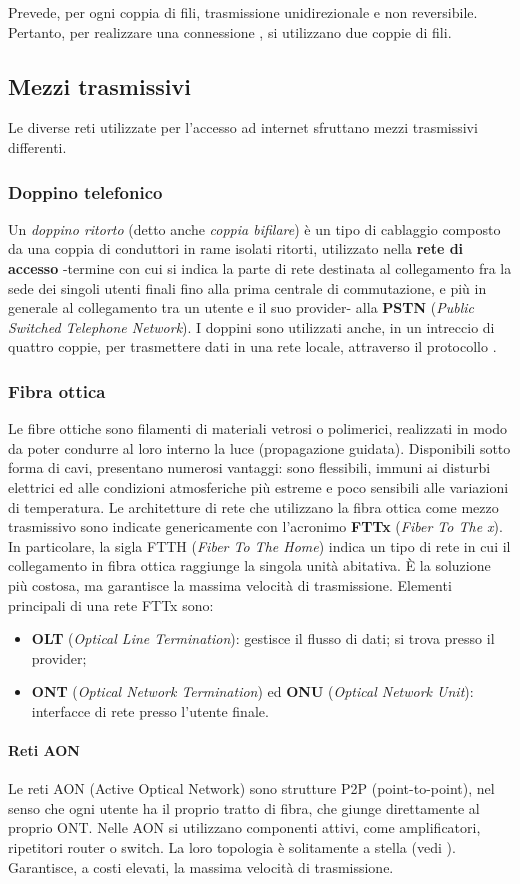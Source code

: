 \documentclass[a4paper,11pt]{article}
\def\sub#1{\subsection{#1}\label{#1}}
\def\subsub#1{\subsubsection{#1}\label{#1}}
\def\vedi#1{\nameref{#1}}
\begin{document}
Prevede, per ogni coppia di fili, trasmissione unidirezionale e non reversibile. Pertanto, per realizzare una connessione \vedi{Full-Duplex}, si utilizzano due coppie di fili. 
\sub{Mezzi trasmissivi}
Le diverse reti utilizzate per l'accesso ad internet sfruttano mezzi trasmissivi differenti.
\subsub{Doppino telefonico}
Un \textit{doppino ritorto} (detto anche \textit{coppia bifilare}) è un tipo di cablaggio composto da una coppia di conduttori in rame isolati ritorti, utilizzato nella \textbf{rete di accesso} -termine con cui si indica la parte di rete destinata al collegamento fra la sede dei singoli utenti finali fino alla prima centrale di commutazione, e più in generale al collegamento tra un utente e il suo provider- alla \textbf{PSTN} (\textit{Public Switched Telephone Network}).
I doppini sono utilizzati anche, in un intreccio di quattro coppie, per trasmettere dati in una rete locale, attraverso il protocollo \vedi{Ethernet}. %
\subsub{Fibra ottica}
Le fibre ottiche sono filamenti di materiali vetrosi o polimerici, realizzati in modo da poter condurre al loro interno la luce (propagazione guidata). Disponibili sotto forma di cavi, presentano numerosi vantaggi: sono flessibili, immuni ai disturbi elettrici ed alle condizioni atmosferiche più estreme e poco sensibili alle variazioni di temperatura.
Le architetture di rete che utilizzano la fibra ottica come mezzo trasmissivo sono indicate genericamente con l'acronimo \textbf{FTTx} (\textit{Fiber To The x}). In particolare, la sigla FTTH (\textit{Fiber To The Home}) indica un tipo di rete in cui il collegamento in fibra ottica raggiunge la singola unità abitativa. È la soluzione più costosa, ma garantisce la massima velocità di trasmissione. 
Elementi principali di una rete FTTx sono:
\begin{itemize}
\item \textbf{OLT} (\textit{Optical Line Termination}): gestisce il flusso di dati; si trova presso il provider;
\item \textbf{ONT} (\textit{Optical Network Termination}) ed \textbf{ONU} (\textit{Optical Network Unit}): interfacce di rete presso l'utente finale.
\end{itemize}
\paragraph{Reti AON} Le reti AON (Active Optical Network) sono strutture P2P (point-to-point), nel senso che ogni utente ha il proprio tratto di fibra, che giunge direttamente al proprio ONT. Nelle AON si utilizzano componenti attivi, come amplificatori, ripetitori router o switch. La loro topologia è solitamente a stella (vedi \vedi{Rete a stella}). Garantisce, a costi elevati, la massima velocità di trasmissione.
\end{document}
